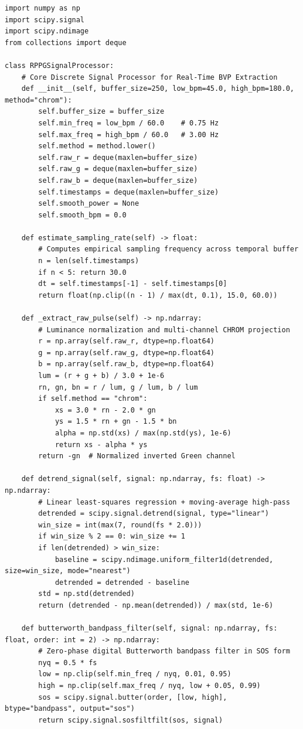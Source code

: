 \documentclass[11pt,a4paper]{report}
\begin{document}
\begin{lstlisting}[caption={Core Discrete Signal Processing Engine (\texttt{dsp\_pipeline.py})}, label={lst:dsp_code}]
import numpy as np
import scipy.signal
import scipy.ndimage
from collections import deque

class RPPGSignalProcessor:
    # Core Discrete Signal Processor for Real-Time BVP Extraction
    def __init__(self, buffer_size=250, low_bpm=45.0, high_bpm=180.0, method="chrom"):
        self.buffer_size = buffer_size
        self.min_freq = low_bpm / 60.0    # 0.75 Hz
        self.max_freq = high_bpm / 60.0   # 3.00 Hz
        self.method = method.lower()
        self.raw_r = deque(maxlen=buffer_size)
        self.raw_g = deque(maxlen=buffer_size)
        self.raw_b = deque(maxlen=buffer_size)
        self.timestamps = deque(maxlen=buffer_size)
        self.smooth_power = None
        self.smooth_bpm = 0.0

    def estimate_sampling_rate(self) -> float:
        # Computes empirical sampling frequency across temporal buffer
        n = len(self.timestamps)
        if n < 5: return 30.0
        dt = self.timestamps[-1] - self.timestamps[0]
        return float(np.clip((n - 1) / max(dt, 0.1), 15.0, 60.0))

    def _extract_raw_pulse(self) -> np.ndarray:
        # Luminance normalization and multi-channel CHROM projection
        r = np.array(self.raw_r, dtype=np.float64)
        g = np.array(self.raw_g, dtype=np.float64)
        b = np.array(self.raw_b, dtype=np.float64)
        lum = (r + g + b) / 3.0 + 1e-6
        rn, gn, bn = r / lum, g / lum, b / lum
        if self.method == "chrom":
            xs = 3.0 * rn - 2.0 * gn
            ys = 1.5 * rn + gn - 1.5 * bn
            alpha = np.std(xs) / max(np.std(ys), 1e-6)
            return xs - alpha * ys
        return -gn  # Normalized inverted Green channel

    def detrend_signal(self, signal: np.ndarray, fs: float) -> np.ndarray:
        # Linear least-squares regression + moving-average high-pass
        detrended = scipy.signal.detrend(signal, type="linear")
        win_size = int(max(7, round(fs * 2.0)))
        if win_size % 2 == 0: win_size += 1
        if len(detrended) > win_size:
            baseline = scipy.ndimage.uniform_filter1d(detrended, size=win_size, mode="nearest")
            detrended = detrended - baseline
        std = np.std(detrended)
        return (detrended - np.mean(detrended)) / max(std, 1e-6)

    def butterworth_bandpass_filter(self, signal: np.ndarray, fs: float, order: int = 2) -> np.ndarray:
        # Zero-phase digital Butterworth bandpass filter in SOS form
        nyq = 0.5 * fs
        low = np.clip(self.min_freq / nyq, 0.01, 0.95)
        high = np.clip(self.max_freq / nyq, low + 0.05, 0.99)
        sos = scipy.signal.butter(order, [low, high], btype="bandpass", output="sos")
        return scipy.signal.sosfiltfilt(sos, signal)


\end{lstlisting}
\end{document}
